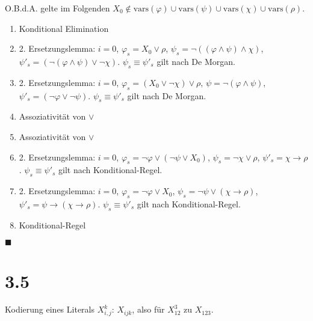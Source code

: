 \documentclass[12pt,a4paper]{scrartcl}
\begin{document}
O.B.d.A. gelte im Folgenden $X_0 \not\in \textrm{vars}(\varphi) \cup \textrm{vars}(\psi) \cup \textrm{vars}(\chi) \cup \textrm{vars}(\rho)$.

\begin{enumerate} 
\item Konditional Elimination 
\item 2. Ersetzungslemma:
$i = 0$, $\varphi_s = X_0 \vee \rho$, $\psi_s = \neg((\varphi \wedge \psi) \wedge \chi)$, $\psi'_s = (\neg(\varphi \wedge \psi) \vee \neg\chi)$.
$\psi_s \equiv \psi'_s$ gilt nach De Morgan.
\item 2. Ersetzungslemma:
$i = 0$, $\varphi_s = (X_0 \vee \neg\chi) \vee \rho$, $\psi = \neg(\varphi \wedge \psi)$, $\psi'_s = (\neg\varphi \vee \neg\psi)$.
$\psi_s \equiv \psi'_s$ gilt nach De Morgan.
\item Assoziativität von $\vee$
\item Assoziativität von $\vee$
\item 2. Ersetzungslemma:
$i = 0$, $\varphi_s = \neg\varphi \vee (\neg\psi \vee X_0)$, $\psi_s = \neg\chi \vee \rho$, $\psi'_s = \chi \rightarrow \rho$.
$\psi_s \equiv \psi'_s$ gilt nach Konditional-Regel.
\item 2. Ersetzungslemma:
$i = 0$, $\varphi_s = \neg\varphi \vee X_0$, $\psi_s = \neg\psi \vee (\chi \rightarrow \rho)$, $\psi'_s = \psi \rightarrow (\chi \rightarrow \rho)$.
$\psi_s \equiv \psi'_s$ gilt nach Konditional-Regel.
\item Konditional-Regel
\end{enumerate}

$\blacksquare$

\section*{3.5}

Kodierung eines Literals $X_{i,j}^k$: $X_{ijk}$, also für $X_{12}^3$ zu $X_{123}$.


\end{document}
